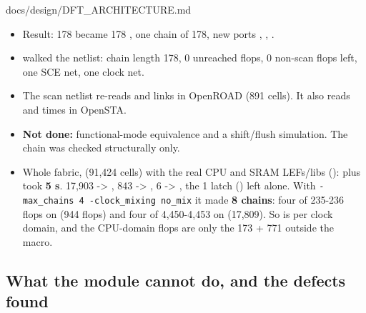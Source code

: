 \begin{relocated}{docs/design/DFT_ARCHITECTURE.md}
\begin{itemize}
\tightlist
\item
  Result: 178  became 178 , one chain of
  178, new ports , ,
  .
\item
   walked the netlist: chain length 178, 0
  unreached flops, 0 non-scan flops left, one SCE net, one clock net.
\item
  The scan netlist re-reads and links in OpenROAD (891 cells). It also
  reads and times in OpenSTA.
\item
  \textbf{Not done:} functional-mode equivalence and a
  shift/\allowbreak{}flush simulation. The chain was checked
  structurally only.
\item
  Whole fabric,
   (91,424
  cells) with the real CPU and SRAM LEFs/libs
  ():  plus
   took \textbf{5 s}. 17,903 
  -\textgreater{} , 843  -\textgreater{}
  , 6  -\textgreater{} , the
  1 latch () left alone. With
  \texttt{-\allowbreak{}max\_\allowbreak{}chains\ 4\ -\allowbreak{}clock\_\allowbreak{}mixing\ no\_\allowbreak{}mix}
  it made \textbf{8 chains}: four of 235-236 flops on 
  (944 flops) and four of 4,450-4,453 on  (17,809). So
   is per clock domain, and the CPU-domain flops are
  only the 173 + 771 outside the macro.
\end{itemize}

\subsection{What the module cannot do, and the defects found}\label{tm:ch:dft-architecture:13-what-the-module-cannot-do-and-the-defects-found}

{\footnotesize\setlength{\tabcolsep}{3pt}

}
\end{relocated}
